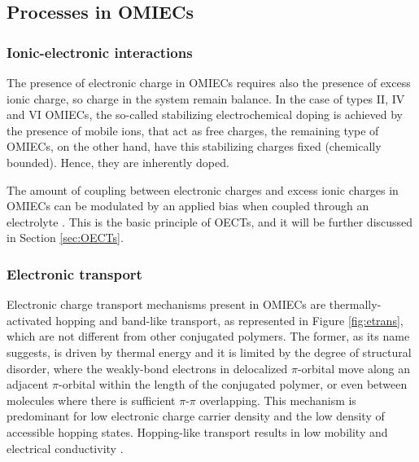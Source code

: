\subsection{Processes in OMIECs}

\subsubsection{Ionic-electronic interactions}
The presence of electronic charge in OMIECs %
requires also the presence of excess ionic charge, so charge in the system remain balance. In the case of types II, IV and VI OMIECs, the so-called stabilizing electrochemical doping is achieved by the presence of mobile ions, that act as free charges, the remaining type of OMIECs, on the other hand, have this stabilizing charges fixed (chemically bounded). Hence, they are inherently doped.


The amount of coupling between electronic charges and excess ionic charges in OMIECs can be modulated by an applied bias when coupled through an electrolyte \cite{paulsenOrganicMixedIonic2020}. This is the basic principle of OECTs, and it will be further discussed in Section \ref{sec:OECTs}.

\subsubsection{Electronic transport}

Electronic charge transport mechanisms present in OMIECs are thermally-activated hopping and band-like transport, as represented in Figure \ref{fig:etrans}, which are not different from other conjugated polymers. The former, as its name suggests, is driven by thermal energy and it is limited by the degree of structural disorder, where the weakly-bond electrons in delocalized $\pi$-orbital move along an adjacent $\pi$-orbital within the length of the conjugated polymer, or even between molecules where there is sufficient $\pi$-$\pi$ overlapping. This mechanism is predominant for low electronic charge carrier density and the low density of accessible hopping states. Hopping-like transport results in low mobility and electrical conductivity \cite{paulsenOrganicMixedIonic2020}. 

